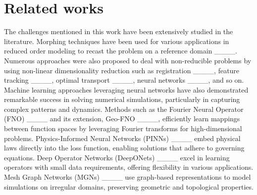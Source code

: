 \section{Related works}
The challenges mentioned in this work have been extensively studied in the literature. Morphing techniques have been used for various applications in reduced order modeling to recast the problem on a reference domain ____. Numerous approaches were also proposed to deal with non-reducible problems by using non-linear dimensionality reduction such as registration ____, feature tracking ____, optimal transport ____, neural networks ____, and so on. Machine learning approaches leveraging neural networks have also demonstrated remarkable success in solving numerical simulations, particularly in capturing complex patterns and dynamics. Methods such as the Fourier Neural Operator (FNO) ____ and its extension, Geo-FNO ____, efficiently learn mappings between function spaces by leveraging Fourier transforms for high-dimensional problems. Physics-Informed Neural Networks (PINNs) ____ embed physical laws directly into the loss function, enabling solutions that adhere to governing equations. Deep Operator Networks (DeepONets) ____ excel in learning operators with small data requirements, offering flexibility in various applications. Mesh Graph Networks (MGNs) ____ use graph-based representations to model simulations on irregular domains, preserving geometric and topological properties.